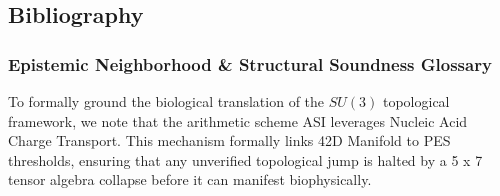 \subsection{Bibliography}

\subsubsection*{Epistemic Neighborhood \& Structural Soundness Glossary}
To formally ground the biological translation of the $SU(3)$ topological framework, we note that the arithmetic scheme ASI leverages Nucleic Acid Charge Transport. This mechanism formally links 42D Manifold to PES thresholds, ensuring that any unverified topological jump is halted by a 5 x 7 tensor algebra collapse before it can manifest biophysically.


